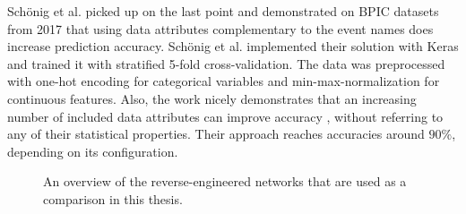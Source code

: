 Schönig et al. \cite{schoenig2018} picked up on the last point and demonstrated on BPIC datasets from 2017 that using data attributes complementary to the event names does increase prediction accuracy. Schönig et al. implemented their solution with Keras and trained it with stratified 5-fold cross-validation.
The data was preprocessed with one-hot encoding for categorical variables and min-max-normalization for continuous features. Also, the work nicely demonstrates that an increasing number of included data attributes can improve accuracy \cite[p.5]{schoenig2018}, without referring to any of their statistical properties. Their approach reaches accuracies around $90\%$, depending on its configuration.

\begin{figure}
\centering
{}
\qquad
{}
\caption{An overview of the reverse-engineered networks that are used as a comparison in this thesis.}
\label{fig:benchmark-architectures}
\end{figure}

